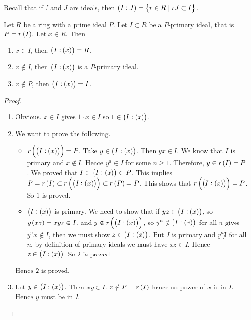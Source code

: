 \pagebreak

Recall that if $ I $ and $ J $ are ideals, then $ \br{I : J} = \cbr{r \in R \mid rJ \subset I} $.

\begin{lemma}
\label{lem:11.7}
Let $ R $ be a ring with a prime ideal $ P $. Let $ I \subset R $ be a $ P $-primary ideal, that is $ P = r\br{I} $. Let $ x \in R $. Then
\begin{enumerate}
\item $ x \in I $, then $ \br{I : \br{x}} = R $.
\item $ x \notin I $, then $ \br{I : \br{x}} $ is a $ P $-primary ideal.
\item $ x \notin P $, then $ \br{I : \br{x}} = I $.
\end{enumerate}
\end{lemma}


\begin{proof}
\hfill
\begin{enumerate}
\item Obvious. $ x \in I $ gives $ 1 \cdot x \in I $ so $ 1 \in \br{I : \br{x}} $.
\item We want to prove the following.
\begin{itemize}
\item $ r\br{\br{I : \br{x}}} = P $. Take $ y \in \br{I : \br{x}} $. Then $ yx \in I $. We know that $ I $ is primary and $ x \notin I $. Hence $ y^n \in I $ for some $ n \ge 1 $. Therefore, $ y \in r\br{I} = P $. We proved that $ I \subset \br{I : \br{x}} \subset P $. This implies $ P = r\br{I} \subset r\br{\br{I : \br{x}}} \subset r\br{P} = P $. This shows that $ r\br{\br{I : \br{x}}} = P $. So $ 1 $ is proved.
\item $ \br{I : \br{x}} $ is primary. We need to show that if $ yz \in \br{I : \br{x}} $, so $ y\br{xz} = xyz \in I $, and $ y \notin r\br{\br{I : \br{x}}} $, so $ y^n \notin \br{I : \br{x}} $ for all $ n $ gives $ y^nx \notin I $, then we must show $ z \in \br{I : \br{x}} $. But $ I $ is primary and $ y^n \not I $ for all $ n $, by definition of primary ideals we must have $ xz \in I $. Hence $ z \in \br{I : \br{x}} $. So $ 2 $ is proved.
\end{itemize}
Hence $ 2 $ is proved.
\item Let $ y \in \br{I : \br{x}} $. Then $ xy \in I $. $ x \notin P = r\br{I} $ hence no power of $ x $ is in $ I $. Hence $ y $ must be in $ I $.
\end{enumerate}
\end{proof}

